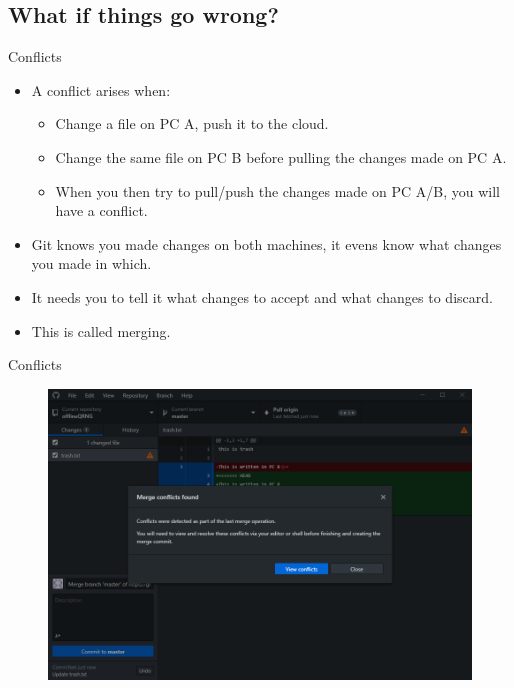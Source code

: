 \documentclass[usenames,dvipsnames,aspectratio=169]{beamer}
\newcommand{\aitem}{\item[$\cdot$]}
\newcommand{\bitem}{\item[-]}
\begin{document}
\subsection{What if things go wrong?} %
\begin{frame}[t]{Conflicts}
\begin{itemize}
\aitem A conflict arises when:
\begin{itemize}
\bitem Change a file on PC A, push it to the cloud.
\bitem Change the same file on PC B before pulling the changes made on PC A.
\bitem When you then try to pull/push the changes made on PC A/B, you will have a conflict.
\end{itemize}
\aitem Git knows you made changes on both machines, it evens know what changes you made in which.
\aitem It needs you to tell it what changes to accept and what changes to discard.
\aitem This is called merging.
\end{itemize}
\end{frame}


\begin{frame}[t]{Conflicts}
\begin{figure}
\centering
\includegraphics[width=.7\linewidth]{conflict1}
\end{figure}
\end{frame}

\end{document}
